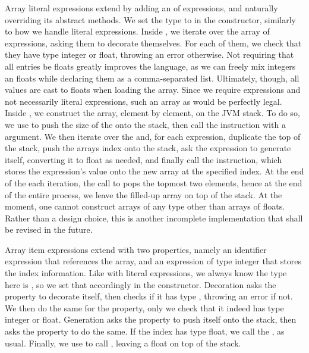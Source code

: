 Array literal expressions extend  by adding an  of expressions, and naturally overriding its abstract methods. We set the type to  in the constructor, similarly to how we handle literal expressions. Inside , we iterate over the array of expressions, asking them to decorate themselves. For each of them, we check that they have type integer or float, throwing an error otherwise. Not requiring that all entries be floats greatly improves the language, as we can freely mix integers an floats while declaring them as a comma-separated list. Ultimately, though, all values are cast to floats when loading the array. Since we require expressions and not necessarily literal expressions, such an array as \il{[1, pow(2, 3.2), 3.5, pi]} would be perfectly legal. Inside , we construct the array, element by element, on the JVM stack. To do so, we use  to push the size of the  onto the stack, then call the  instruction with a  argument. We then iterate over the  and, for each expression, duplicate the top of the stack, push the arrays index onto the stack, ask the expression to generate itself, converting it to float as needed, and finally call the  instruction, which stores the expression's value onto the new array at the specified index. At the end of the each iteration, the call to  pops the topmost two elements, hence at the end of the entire process, we leave the filled-up array on top of the stack. At the moment, one cannot construct arrays of any type other than arrays of floats. Rather than a design choice, this is another incomplete implementation that shall be revised in the future.

Array item expressions extend  with two properties, namely an identifier expression that references the array, and an expression of type integer that stores the index information. Like with literal expressions, we always know the type here is , so we set that accordingly in the constructor. Decoration asks the  property to decorate itself, then checks if it has type , throwing an error if not. We then do the same for the  property, only we check that it indeed has type integer or float. Generation asks the  property to push itself onto the stack, then asks the  property to do the same. If the index has type float, we call the , as usual. Finally, we use  to call , leaving a float on top of the stack.

